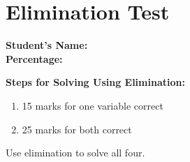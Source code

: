 \documentclass[12pt, a4paper, addpoints]{exam}
\newcommand{\elimination}[6]{%
    \pgfmathsetmacro{\cval}{#3*#1 + #4*#2} %
    \pgfmathsetmacro{\pval}{#5*#1 + #6*#2} %

    \def\formata{%
        \ifnum#3=1
            x
        \else\ifnum#3=-1
            -x
        \else
            \pgfmathprintnumber{#3}x
        \fi\fi}

    \def\formatb{%
        \ifnum#4=1
            +y
        \else\ifnum#4=-1
            -y
        \else
            \ifnum#4<0 \pgfmathprintnumber{#4}y \else +\pgfmathprintnumber{#4}y \fi
        \fi\fi}

    \def\formatd{%
        \ifnum#5=1
            x
        \else\ifnum#5=-1
            -x
        \else
            \pgfmathprintnumber{#5}x
        \fi\fi}

    \def\formate{%
        \ifnum#6=1
            +y
        \else\ifnum#6=-1
            -y
        \else
            \ifnum#6<0 \pgfmathprintnumber{#6}y \else +\pgfmathprintnumber{#6}y \fi
        \fi\fi}

    \[
    \begin{aligned}
    \formata \formatb &= \pgfmathprintnumber{\cval} \\[-1pt]
    \formatd \formate &= \pgfmathprintnumber{\pval}
    \end{aligned}
    \]
}
\begin{document}
\noindent
\begin{minipage}{0.3\textwidth}
\section*{Elimination Test}
\end{minipage}
\begin{minipage}{0.7\textwidth}
\raggedleft
\textbf{Student's Name:} \underline{\hspace{7cm}} \\[0.2cm]
\textbf{Percentage:} \underline{\hspace{7cm}} \\
\end{minipage}


\begin{mdframed}[backgroundcolor=gray!20, roundcorner=5pt]
\textbf{Steps for Solving Using Elimination:}
\begin{multicols}{2}
\Large
\begin{enumerate}
    \item 15 marks for one variable correct
    \item 25 marks for both correct
\end{enumerate}
\end{multicols}
\end{mdframed}

\newcommand{\verticalspace}{\vspace{60mm}}  %

\huge
\begin{questions}
\question Use  elimination  to solve all four.




\end{questions}
\end{document}
